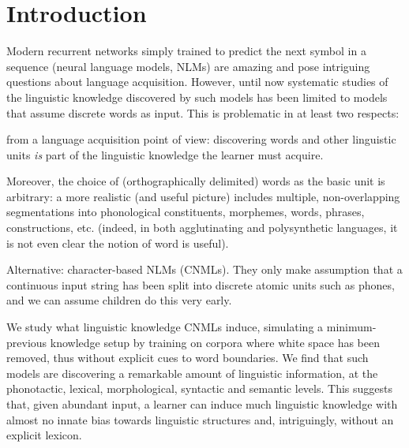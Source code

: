 \section{Introduction}
\label{sec:introduction}

Modern recurrent networks simply trained to predict the next symbol in
a sequence (neural language models, NLMs) are amazing and pose
intriguing questions about language acquisition. However, until now
systematic studies of the linguistic knowledge discovered by such
models has been limited to models that assume discrete words as
input. This is problematic in at least two
respects: \begin{inparaenum}[i)]
\item from a language
  acquisition point of view: discovering words and other linguistic
  units \emph{is} part of the linguistic knowledge the learner must
  acquire. 
\item Moreover, the choice of (orthographically delimited) words as
  the basic unit is arbitrary: a more realistic (and useful picture)
  includes multiple, non-overlapping segmentations into phonological
  constituents, morphemes, words, phrases, constructions,
  etc. (indeed, in both agglutinating and polysynthetic languages, it
  is not even clear the notion of word is useful).
\end{inparaenum}

Alternative: character-based NLMs (CNMLs). They only make assumption
that a continuous input string has been split into discrete atomic
units such as phones, and we can assume children do this very early.

We study what linguistic knowledge CNMLs induce, simulating a
minimum-previous knowledge setup by training on corpora where white
space has been removed, thus without explicit cues to word
boundaries. We find that such models are discovering a remarkable
amount of linguistic information, at the phonotactic, lexical,
morphological, syntactic and semantic levels. This suggests that,
given abundant input, a learner can induce much linguistic knowledge
with almost no innate bias towards linguistic structures and,
intriguingly, without an explicit lexicon.
